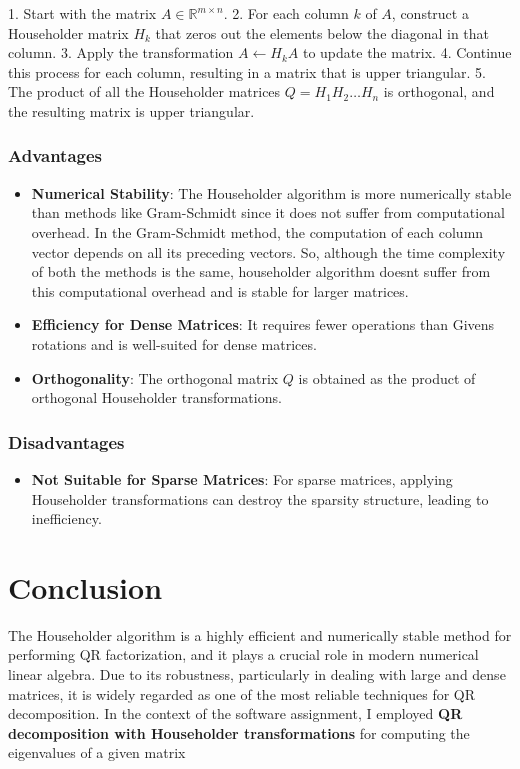 \documentclass[final]{article}
\begin{document}
1. Start with the matrix $ A \in \mathbb{R}^{m \times n} $.
2. For each column $ k $ of $ A $, construct a Householder matrix $ H_k $ that zeros out the elements below the diagonal in that column.
3. Apply the transformation $ A \leftarrow H_k A $ to update the matrix.
4. Continue this process for each column, resulting in a matrix that is upper triangular.
5. The product of all the Householder matrices $ Q = H_1 H_2 \dots H_n $ is orthogonal, and the resulting matrix is upper triangular.

\subsubsection{Advantages}

\begin{itemize}
    \item \textbf{Numerical Stability}: The Householder algorithm is more numerically stable than methods like Gram-Schmidt since it does not suffer from computational overhead. In the Gram-Schmidt method, the computation of each column vector depends on all its preceding vectors. So, although the time complexity of both the methods is the same, householder algorithm doesnt suffer from this computational overhead and is stable for larger matrices.
    \item \textbf{Efficiency for Dense Matrices}: It requires fewer operations than Givens rotations and is well-suited for dense matrices.
    \item \textbf{Orthogonality}: The orthogonal matrix $ Q $ is obtained as the product of orthogonal Householder transformations.
\end{itemize}

\subsubsection{Disadvantages}

\begin{itemize}
    \item \textbf{Not Suitable for Sparse Matrices}: For sparse matrices, applying Householder transformations can destroy the sparsity structure, leading to inefficiency.
\end{itemize}

\section{Conclusion}
The Householder algorithm is a highly efficient and numerically stable method for performing QR factorization, and it plays a crucial role in modern numerical linear algebra. Due to its robustness, particularly in dealing with large and dense matrices, it is widely regarded as one of the most reliable techniques for QR decomposition.
In the context of the software assignment, I employed \textbf{QR decomposition with Householder transformations} for computing the eigenvalues of a given matrix
\end{document}
